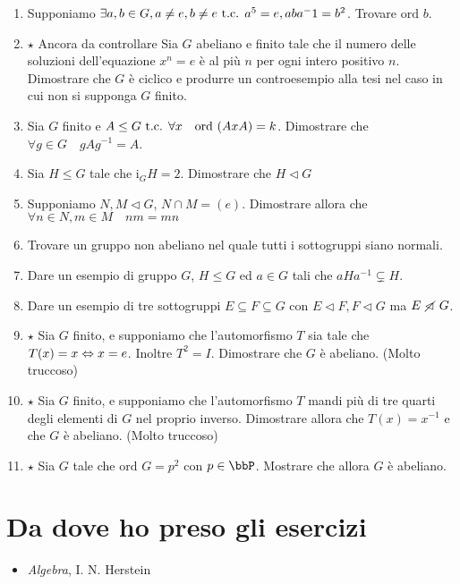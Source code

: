 \documentclass[a4paper,NoNotes,GeneralMath]{stdmdoc}
\newcommand{\Ord}{\text{ord }}
\newcommand{\sgr}{\le}
\newcommand{\nrm}{\lhd}
\newcommand{\ctrl}{{\color{blue} Ancora da controllare }}
\newcommand{\Ind}{\text{i}}
\newcommand{\Star}{ $ \star $ }
\newcommand\nnrm{\mathrel{\ooalign{\hss$\diagup$\hss\cr$\lhd$}}}
\begin{document}
\begin{enumerate}
		\item Supponiamo $\exists a,b \in G, a \neq e, b \neq e \mbox{ t.c. } a^5 = e, aba^-1 = b^2$. Trovare $\Ord b$.
		\item \Star \ctrl Sia $G$ abeliano e finito tale che il numero delle soluzioni dell'equazione $x^n = e$ è al più $n$ per ogni intero positivo $n$. Dimostrare che $G$ è ciclico e produrre un controesempio alla tesi nel caso in cui non si supponga $G$ finito.
		\item Sia $G$ finito e $A \sgr G \tc \forall x \quad \Ord(AxA) = k$. Dimostrare che $\forall g\in G \quad gAg^{-1} = A$.
		\item Sia $H \sgr G$ tale che $\Ind_G H = 2$. Dimostrare che $H \nrm G$
		\item Supponiamo $N, M \nrm G$, $N \cap M = (e)$. Dimostrare allora che $\forall n\in N, m\in M \quad nm = mn$
		\item Trovare un gruppo non abeliano nel quale tutti i sottogruppi siano normali. 
		\item Dare un esempio di gruppo $G$, $H \sgr G$ ed $a \in G$ tali che $aHa^{-1} \subsetneq H$.
		\item Dare un esempio di tre sottogruppi $E \subseteq F \subseteq G$ con $E \nrm F, F \nrm G$ ma $E \nnrm G$.
		\item \Star Sia $G$ finito, e supponiamo che l'automorfismo $T$ sia tale che $T(x) = x \Leftrightarrow x = e$. Inoltre $T^2 = I$. Dimostrare che $G$ è abeliano. (Molto truccoso)
		\item \Star Sia $G$ finito, e supponiamo che l'automorfismo $T$ mandi più di tre quarti degli elementi di $G$ nel proprio inverso. Dimostrare allora che $T(x) = x^{-1}$ e che $G$ è abeliano. (Molto truccoso)
		\item \Star Sia $G$ tale che $\Ord G = p^2$ con $p \in \bbP$. Mostrare che allora $G$ è abeliano.
	\end{enumerate}

	\section*{Da dove ho preso gli esercizi}
	\begin{itemize}
		\item {\it Algebra}, I. N. Herstein
	\end{itemize}
\end{document}
